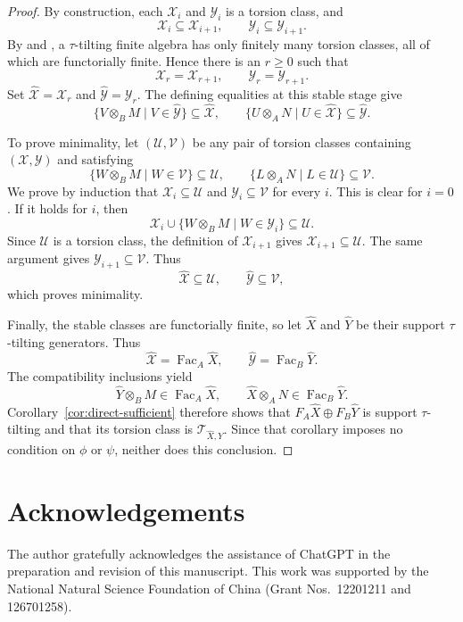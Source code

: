 \documentclass[11pt,reqno]{amsart}
\theoremstyle{definition}
\theoremstyle{remark}
\newcommand{\Fac}{\operatorname{Fac}}
\numberwithin{equation}{section}
\begin{document}
\begin{proof}
By construction, each $\mathcal X_i$ and $\mathcal Y_i$ is a torsion class,
and
\[
 \mathcal X_i\subseteq\mathcal X_{i+1},
 \qquad
 \mathcal Y_i\subseteq\mathcal Y_{i+1}.
\]
By \cite[Theorem~2.7]{AIR} and \cite[Theorem~3.8]{DIJ}, a $\tau$-tilting
finite algebra has only finitely many torsion classes, all of which are
functorially finite.  Hence there is an $r\geq0$ such that
\[
 \mathcal X_r=\mathcal X_{r+1},
 \qquad
 \mathcal Y_r=\mathcal Y_{r+1}.
\]
Set $\widehat{\mathcal X}=\mathcal X_r$ and
$\widehat{\mathcal Y}=\mathcal Y_r$.  The defining equalities at this stable
stage give
\[
 \{V\otimes_BM\mid V\in\widehat{\mathcal Y}\}
 \subseteq\widehat{\mathcal X},
 \qquad
 \{U\otimes_AN\mid U\in\widehat{\mathcal X}\}
 \subseteq\widehat{\mathcal Y}.
\]

To prove minimality, let $(\mathcal U,\mathcal V)$ be any pair of torsion
classes containing $(\mathcal X,\mathcal Y)$ and satisfying
\[
 \{W\otimes_BM\mid W\in\mathcal V\}\subseteq\mathcal U,
 \qquad
 \{L\otimes_AN\mid L\in\mathcal U\}\subseteq\mathcal V.
\]
We prove by induction that
$\mathcal X_i\subseteq\mathcal U$ and
$\mathcal Y_i\subseteq\mathcal V$ for every $i$.  This is clear for $i=0$.
If it holds for $i$, then
\[
 \mathcal X_i\cup
 \{W\otimes_BM\mid W\in\mathcal Y_i\}
 \subseteq\mathcal U.
\]
Since $\mathcal U$ is a torsion class, the definition of $\mathcal X_{i+1}$
gives $\mathcal X_{i+1}\subseteq\mathcal U$.  The same argument gives
$\mathcal Y_{i+1}\subseteq\mathcal V$.  Thus
\[
 \widehat{\mathcal X}\subseteq\mathcal U,
 \qquad
 \widehat{\mathcal Y}\subseteq\mathcal V,
\]
which proves minimality.

Finally, the stable classes are functorially finite, so let $\widehat X$ and
$\widehat Y$ be their support $\tau$-tilting generators.  Thus
\[
 \widehat{\mathcal X}=\Fac_A\widehat X,
 \qquad
 \widehat{\mathcal Y}=\Fac_B\widehat Y.
\]
The compatibility inclusions yield
\[
 \widehat Y\otimes_BM\in\Fac_A\widehat X,
 \qquad
 \widehat X\otimes_AN\in\Fac_B\widehat Y.
\]
Corollary~\ref{cor:direct-sufficient} therefore shows that
$F_A\widehat X\oplus F_B\widehat Y$ is support $\tau$-tilting and that its
torsion class is $\mathcal T_{\widehat X,\widehat Y}$.  Since that corollary
imposes no condition on $\phi$ or $\psi$, neither does this conclusion.
\end{proof}

\section*{Acknowledgements}
The author gratefully acknowledges the assistance of ChatGPT in the preparation
and revision of this manuscript.  This work was supported by the National
Natural Science Foundation of China (Grant Nos.~12201211 and 126701258).
\end{document}
